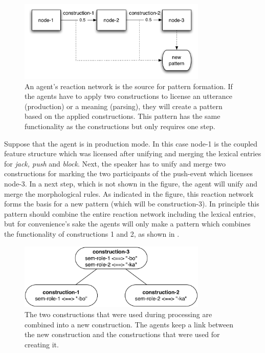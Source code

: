 \begin{figure}[htb]
\centerline{\includegraphics[width=0.8\textwidth]{Chapter4/figs/reaction1}}
  \caption[A reaction network as a source for pattern formation]{An agent's reaction network is the source for pattern formation. If the agents have to apply two constructions to license an utterance (production) or a meaning (parsing), they will create a pattern based on the applied constructions. This pattern has the same functionality as the constructions but only requires one step.}
   \label{f:reaction1}
\end{figure}

Suppose that the agent is in production mode. In this case node-1 is the coupled feature structure which was licensed after unifying and merging the lexical entries for {\em jack, push} and {\em block}. Next, the speaker has to unify and merge two constructions for marking the two participants of the push-event which licenses node-3. In a next step, which is not shown in the figure, the agent will unify and merge the morphological rules. As indicated in the figure, this reaction network forms the basis for a new pattern (which will be construction-3). In principle this pattern should combine the entire reaction network including the lexical entries, but for convenience's sake the agents will only make a pattern which combines the functionality of constructions 1 and 2, as shown in .
\begin{figure}[htb]
\centerline{\includegraphics[width=0.8\textwidth]{Chapter4/figs/new-pattern}}
  \caption[A new pattern]{The two constructions that were used during processing are combined into a new construction. The agents keep a link between the new construction and the constructions that were used for creating it.}
   \label{f:new-pattern}
\end{figure}

